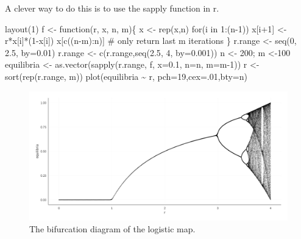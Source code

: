 \documentclass[
  a4paper,
  DIV=11,
  numbers=noendperiod,
  oneside]{scrreprt}
\newenvironment{Shaded}{\begin{snugshade}}{\end{snugshade}}
\newcommand{\AttributeTok}[1]{\textcolor[rgb]{0.40,0.45,0.13}{#1}}
\newcommand{\CommentTok}[1]{\textcolor[rgb]{0.37,0.37,0.37}{#1}}
\newcommand{\ControlFlowTok}[1]{\textcolor[rgb]{0.00,0.23,0.31}{#1}}
\newcommand{\DecValTok}[1]{\textcolor[rgb]{0.68,0.00,0.00}{#1}}
\newcommand{\FloatTok}[1]{\textcolor[rgb]{0.68,0.00,0.00}{#1}}
\newcommand{\FunctionTok}[1]{\textcolor[rgb]{0.28,0.35,0.67}{#1}}
\newcommand{\NormalTok}[1]{\textcolor[rgb]{0.00,0.23,0.31}{#1}}
\newcommand{\OtherTok}[1]{\textcolor[rgb]{0.00,0.23,0.31}{#1}}
\newcommand{\SpecialCharTok}[1]{\textcolor[rgb]{0.37,0.37,0.37}{#1}}
\newcommand{\StringTok}[1]{\textcolor[rgb]{0.13,0.47,0.30}{#1}}
\begin{document}
A clever way to do this is to use the sapply function in r.

\begin{Shaded}
\begin{Highlighting}[]
\FunctionTok{layout}\NormalTok{(}\DecValTok{1}\NormalTok{)}
\NormalTok{f }\OtherTok{\textless{}{-}} \ControlFlowTok{function}\NormalTok{(r, x, n, m)\{}
\NormalTok{  x }\OtherTok{\textless{}{-}} \FunctionTok{rep}\NormalTok{(x,n)}
  \ControlFlowTok{for}\NormalTok{(i }\ControlFlowTok{in} \DecValTok{1}\SpecialCharTok{:}\NormalTok{(n}\DecValTok{{-}1}\NormalTok{)) x[i}\SpecialCharTok{+}\DecValTok{1}\NormalTok{] }\OtherTok{\textless{}{-}}\NormalTok{ r}\SpecialCharTok{*}\NormalTok{x[i]}\SpecialCharTok{*}\NormalTok{(}\DecValTok{1}\SpecialCharTok{{-}}\NormalTok{x[i])}
\NormalTok{  x[}\FunctionTok{c}\NormalTok{((n}\SpecialCharTok{{-}}\NormalTok{m)}\SpecialCharTok{:}\NormalTok{n)] }\CommentTok{\# only return last m iterations}
\NormalTok{\}}
\NormalTok{r.range }\OtherTok{\textless{}{-}} \FunctionTok{seq}\NormalTok{(}\DecValTok{0}\NormalTok{, }\FloatTok{2.5}\NormalTok{, }\AttributeTok{by=}\FloatTok{0.01}\NormalTok{) }
\NormalTok{r.range }\OtherTok{\textless{}{-}} \FunctionTok{c}\NormalTok{(r.range,}\FunctionTok{seq}\NormalTok{(}\FloatTok{2.5}\NormalTok{, }\DecValTok{4}\NormalTok{, }\AttributeTok{by=}\FloatTok{0.001}\NormalTok{)) }
\NormalTok{n }\OtherTok{\textless{}{-}} \DecValTok{200}\NormalTok{; m }\OtherTok{\textless{}{-}}\DecValTok{100} 
\NormalTok{equilibria }\OtherTok{\textless{}{-}} \FunctionTok{as.vector}\NormalTok{(}\FunctionTok{sapply}\NormalTok{(r.range, f,  }\AttributeTok{x=}\FloatTok{0.1}\NormalTok{, }\AttributeTok{n=}\NormalTok{n, }\AttributeTok{m=}\NormalTok{m}\DecValTok{{-}1}\NormalTok{))}
\NormalTok{r }\OtherTok{\textless{}{-}} \FunctionTok{sort}\NormalTok{(}\FunctionTok{rep}\NormalTok{(r.range, m))}
\FunctionTok{plot}\NormalTok{(equilibria }\SpecialCharTok{\textasciitilde{}}\NormalTok{ r, }\AttributeTok{pch=}\DecValTok{19}\NormalTok{,}\AttributeTok{cex=}\NormalTok{.}\DecValTok{01}\NormalTok{,}\AttributeTok{bty=}\StringTok{\textquotesingle{}n\textquotesingle{}}\NormalTok{)}
\end{Highlighting}
\end{Shaded}

\begin{figure}

{\centering \includegraphics{media/ch2/fig-ch2-img8.jpg}

}

\caption{\label{fig-ch2-img8}The bifurcation diagram of the logistic
map.}

\end{figure}
\end{document}
